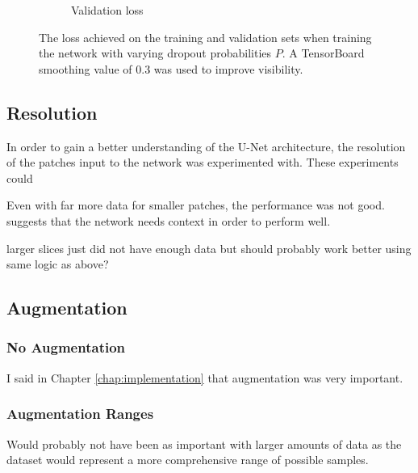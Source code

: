 \begin{figure}[t]
\begin{subfigure}[b]{0.49\textwidth}
        \caption{Validation loss}
    \end{subfigure}
    \caption{The loss achieved on the training and validation sets when training the network with varying dropout probabilities $P$. A TensorBoard smoothing value of 0.3 was used to improve visibility.}
    \label{fig:dropoutplots}
\end{figure}

\subsection{Resolution}

In order to gain a better understanding of the U-Net architecture, the resolution of the patches input to the network was experimented with. These experiments could 

Even with far more data for smaller patches, the performance was not good. suggests that the network needs context in order to perform well.

larger slices just did not have enough data but should probably work better using same logic as above?

\subsection{Augmentation}
\label{sec:evalaugmentation}

\subsubsection{No Augmentation}

I said in Chapter \ref{chap:implementation} that augmentation was very important.

\subsubsection{Augmentation Ranges}

Would probably not have been as important with larger amounts of data as the dataset would represent a more comprehensive range of possible samples.

